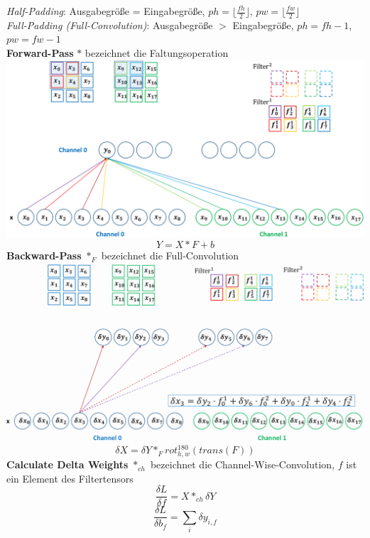 \documentclass[12pt]{article}
\begin{document}
	\textit{Half-Padding}: Ausgabegröße = Eingabegröße, $ph = \lfloor \frac{fh}{2} \rfloor$, $pw = \lfloor \frac{fw}{2} \rfloor$\\
	\textit{Full-Padding (Full-Convolution)}: Ausgabegröße $>$ Eingabegröße, $ph = fh - 1$, $pw = fw - 1$\\
	\textbf{Forward-Pass} $*$ bezeichnet die Faltungsoperation\\
	\includegraphics[width=\linewidth]{figures/convolution.png}
	$$Y = X * F + b$$
	\textbf{Backward-Pass} $*_F$ bezeichnet die Full-Convolution\\
	\includegraphics[width=\linewidth]{figures/convolution-backward.png}
	$$\delta X = \delta Y *_F rot^{180}_{h,w}(trans(F))$$
	\textbf{Calculate Delta Weights} $*_{ch}$ bezeichnet die Channel-Wise-Convolution, $f$ ist ein Element des Filtertensors
	$$\frac{\delta L}{\delta f} = X *_{ch} \delta Y$$
	$$\frac{\delta L}{\delta b_f} = \sum_i \delta y_{i,f}$$
\end{document}
